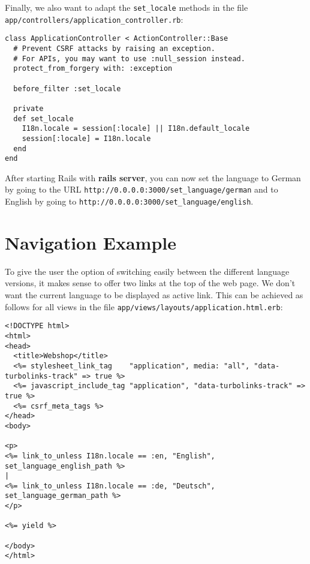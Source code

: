 \documentclass[a4paper]{book}
\begin{document}
Finally, we also want to adapt the \texttt{set\_locale} methods in the file \texttt{app/controllers/application\_controller.rb}:

\begin{shaded}\begin{verbatim}
class ApplicationController < ActionController::Base
  # Prevent CSRF attacks by raising an exception.
  # For APIs, you may want to use :null_session instead.
  protect_from_forgery with: :exception

  before_filter :set_locale

  private
  def set_locale
    I18n.locale = session[:locale] || I18n.default_locale
    session[:locale] = I18n.locale
  end
end
\end{verbatim}\end{shaded}

After starting Rails with \textbf{rails server}, you can now set the language to German by going to the URL \texttt{http://0.0.0.0:3000/set\_language/german} and to English by going to \texttt{http://0.0.0.0:3000/set\_language/english}.

\section{Navigation Example}\label{navigation-example-1}

To give the user the option of switching easily between the different language versions, it makes sense to offer two links at the top of the web page. We don't want the current language to be displayed as active link. This can be achieved as follows for all views in the file \texttt{app/views/layouts/application.html.erb}:

\begin{shaded}\begin{verbatim}
<!DOCTYPE html>
<html>
<head>
  <title>Webshop</title>
  <%= stylesheet_link_tag    "application", media: "all", "data-turbolinks-track" => true %>
  <%= javascript_include_tag "application", "data-turbolinks-track" => true %>
  <%= csrf_meta_tags %>
</head>
<body>

<p>
<%= link_to_unless I18n.locale == :en, "English", set_language_english_path %>
|
<%= link_to_unless I18n.locale == :de, "Deutsch", set_language_german_path %>
</p>

<%= yield %>

</body>
</html>
\end{verbatim}\end{shaded}
\end{document}
